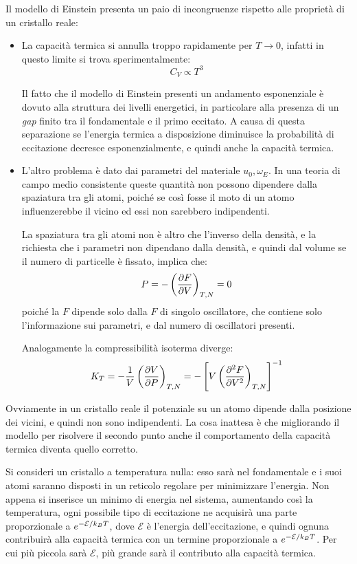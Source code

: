 Il modello di Einstein presenta un paio di incongruenze rispetto alle proprietà di un cristallo reale:
\begin{itemize}
	\item La capacità termica si annulla troppo rapidamente per $ T \rightarrow 0 $, infatti in questo limite si trova sperimentalmente:
	\begin{equation*}
	C_V \propto T^3
	\end{equation*}
	
	Il fatto che il modello di Einstein presenti un andamento esponenziale è dovuto alla struttura dei livelli energetici, in particolare alla presenza di un \textit{gap} finito tra il fondamentale e il primo eccitato.
	A causa di questa separazione se l'energia termica a disposizione diminuisce la probabilità di eccitazione decresce esponenzialmente, e quindi anche la capacità termica.
	\item L'altro problema è dato dai parametri del materiale $ u_0, \omega_E $. In una teoria di campo medio consistente queste quantità non possono dipendere dalla spaziatura tra gli atomi, poiché se così fosse il moto di un atomo influenzerebbe il vicino ed essi non sarebbero indipendenti.
	
	La spaziatura tra gli atomi non è altro che l'inverso della densità, e la richiesta che i parametri non dipendano dalla densità, e quindi dal volume se il numero di particelle è fissato, implica che:
	\begin{equation*}
		P = - \left(\frac{\partial {F}}{\partial {V}}\right)_{T,N} = 0
	\end{equation*}
	poiché la $ F $ dipende solo dalla $ F $ di singolo oscillatore, che contiene solo l'informazione sui parametri, e dal numero di oscillatori presenti.
	
	Analogamente la compressibilità isoterma diverge:
	\begin{equation*}
	K_T = - \frac{1}{V} \left(\frac{\partial {V}}{\partial {P}}\right)_{T,N} = - \left[V \left(\frac{\partial {^2 F}}{\partial {V^2}}\right)_{T,N}\right]^{-1}
	\end{equation*}	
\end{itemize}

Ovviamente in un cristallo reale il potenziale su un atomo dipende dalla posizione dei vicini, e quindi non sono indipendenti. La cosa inattesa è che migliorando il modello per risolvere il secondo punto anche il comportamento della capacità termica diventa quello corretto.

Si consideri un cristallo a temperatura nulla: esso sarà nel fondamentale e i suoi atomi saranno disposti in un reticolo regolare per minimizzare l'energia.
Non appena si inserisce un minimo di energia nel sistema, aumentando così la temperatura, ogni possibile tipo di eccitazione ne acquisirà una parte proporzionale a $ e^{-\mathcal{E}/k_B T} $, dove $ \mathcal{E} $ è l'energia dell'eccitazione, e quindi ognuna contribuirà alla capacità termica con un termine proporzionale a $ e^{-\mathcal{E}/k_B T} $. Per cui più piccola sarà $ \mathcal{E} $, più grande sarà il contributo alla capacità termica.

